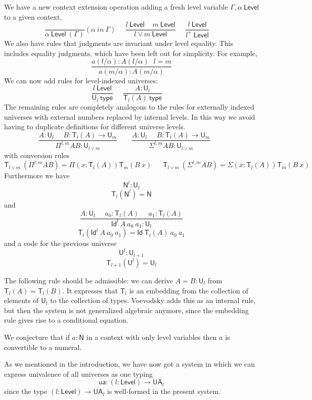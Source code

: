 \documentclass[11pt,a4paper]{article}
\newcommand{\Id}{\mathsf{Id}}
\def\NN{\mathsf{N}}
\def\UU{\mathsf{U}}
\def\Level{\mathsf{Level}}
\newcommand{\type}{\mathsf{type}}
\newcommand{\T}{\mathsf{T}}
\newcommand{\ua}{\mathsf{ua}}
\newcommand{\UA}{\mathsf{UA}}
\begin{document}
We have a new context extension operation adding a fresh level variable $\Gamma,\alpha~\Level$
to a given context.
$$
\frac{}{\alpha~\Level~(\Gamma)}(\alpha~in~\Gamma)~~~~~~
\frac{l~\Level~~~~~m~\Level}{l\vee m~\Level}~~~~~~
\frac{l~\Level}{l^+~\Level}~~~~~~
$$
We also have rules that judgments are invariant under level equality. 
This includes equality judgments, which have been left out for simplicity.
For example,
$$
\frac{a(l/\alpha) : A(l/\alpha)\ \ \ l = m}
{a(m/\alpha) : A(m/\alpha)}
$$
We can  now add rules for level-indexed universes:
$$
\frac{l~\Level}{\UU_{l}~\type}~~~~~~
\frac{A:\UU_{l}}{\T_{l}(A)~\type}~~~~~~
$$
The remaining rules are completely analogous to the rules for externally indexed universes with external numbers replaced by internal levels. In this way we avoid having to duplicate definitions for different universe levels.
$$
\frac{A:\UU_{l}~~~~~~B:\T_{l}(A)\rightarrow \UU_{m}}
     {\Pi^{l,m} A B:\UU_{l\vee m}}~~~~~~~~~
\frac{A:\UU_{l}~~~~~~B:\T_{l}(A)\rightarrow \UU_{m}}
     {\Sigma^{l,m} A B:\UU_{l\vee m}}~~~~~~~~~
$$
with conversion rules
$$
\T_{l\vee m}~(\Pi^{l,m} A B) = \Pi (x:\T_{l}(A)) \T_{m}(B~x)~~~~~~~
\T_{l\vee m}~(\Sigma^{l,m} A B) = \Sigma (x:\T_{l}(A)) \T_{m}(B~x)~~~~~~~
$$
Furthermore we have $$\NN^{l}:\UU_{l}$$
$$\T_{l}(\NN^{l}) = \NN$$
and
$$
\frac{A:\UU_l~~~~~~a_0:\T_l(A)~~~~~~a_1:\T_l(A)}
{\Id^l~A~a_0~a_1:\UU_l}
$$
$$\T_l(\Id^l~A~a_0~a_1) = \Id~\T_l(A)~a_0~a_1$$
and a code for the previous universe
$${\UU^{l}}:\UU_{l + 1}$$
$$\T_{l + 1}({\UU^{l}}) = \UU_{l}$$

%
%
%
%
%
%
%

The following rule should be admissible:
we can derive $A = B : \UU_l$ from $\T_l(A) = \T_l(B)$.
 It expresses that $\T_l$ is an embedding from the collection of elements of $\UU_l$
 to the collection of types.
 Voevodsky \cite[Rule 20 on p. 17]{VV} adds this as an internal rule, but then the system is not
 generalized algebraic anymore, since the embedding rule gives rise to a conditional equation.

We conjecture that if $a : \NN$ in a context with only level variables
then $a$ is convertible to a numeral.

As we mentioned in the introduction, we have now got a system in which we can express univalence of all universes as one typing
$$
\ua : (l : \Level) \to \UA_l
$$
since the type $(l : \Level) \to \UA_l$ is well-formed in the present system.
\end{document}
